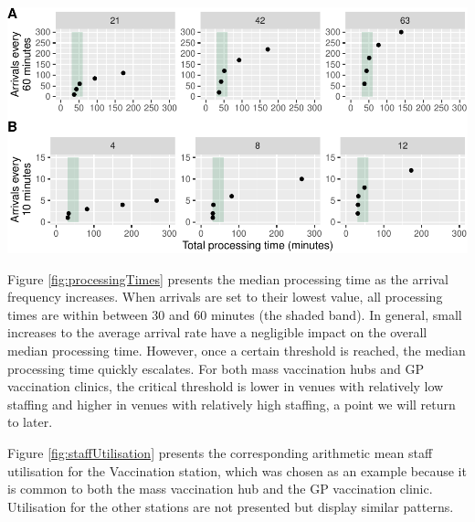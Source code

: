 \documentclass{article}
\let\origfigure\figure
\let\endorigfigure\endfigure
\renewenvironment{figure}[1][2] {
    \expandafter\origfigure\expandafter[H]
} {
    \endorigfigure
}
\begin{document}
\begin{figure}

{\centering \includegraphics{Preprint_files/figure-latex/processingTimes-1} 

}

\caption{Median processing times by arrival frequency for a mass vaccination hub (A) and a GP vaccination clinic (B)}\label{fig:processingTimes}
\end{figure}

Figure \ref{fig:processingTimes} presents the median processing time as
the arrival frequency increases. When arrivals are set to their lowest
value, all processing times are within between 30 and 60 minutes (the
shaded band). In general, small increases to the average arrival rate
have a negligible impact on the overall median processing time. However,
once a certain threshold is reached, the median processing time quickly
escalates. For both mass vaccination hubs and GP vaccination clinics,
the critical threshold is lower in venues with relatively low staffing
and higher in venues with relatively high staffing, a point we will
return to later.

Figure \ref{fig:staffUtilisation} presents the corresponding arithmetic
mean staff utilisation for the Vaccination station, which was chosen as
an example because it is common to both the mass vaccination hub and the
GP vaccination clinic. Utilisation for the other stations are not
presented but display similar patterns.
\end{document}
